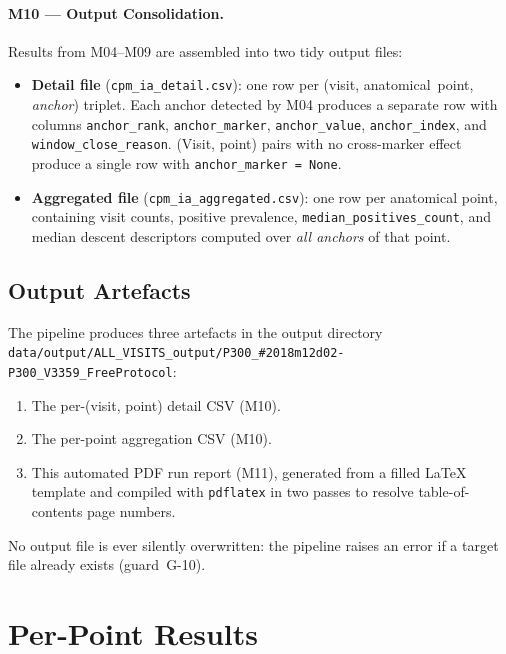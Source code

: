 \documentclass[a4paper,11pt]{article}
\begin{document}
\paragraph{M10 --- Output Consolidation.}
Results from M04--M09 are assembled into two tidy output files:
\begin{itemize}
  \item \textbf{Detail file} (\texttt{cpm\_ia\_detail.csv}): one row per
        (visit, anatomical~point, \emph{anchor}) triplet. Each anchor detected by M04
        produces a separate row with columns \texttt{anchor\_rank},
        \texttt{anchor\_marker}, \texttt{anchor\_value}, \texttt{anchor\_index},
        and \texttt{window\_close\_reason}.
        (Visit, point) pairs with no cross-marker effect produce a single row with
        \texttt{anchor\_marker = None}.
  \item \textbf{Aggregated file} (\texttt{cpm\_ia\_aggregated.csv}): one row per
        anatomical point, containing visit counts, positive prevalence,
        \texttt{median\_positives\_count}, and median descent descriptors computed over
        \emph{all anchors} of that point.
\end{itemize}

\subsection{Output Artefacts}

The pipeline produces three artefacts in the output directory \texttt{data/output/ALL\_VISITS\_output/P300\_\#2018m12d02-P300\_V3359\_FreeProtocol}:
\begin{enumerate}
  \item The per-(visit, point) detail CSV (M10).
  \item The per-point aggregation CSV (M10).
  \item This automated PDF run report (M11), generated from a filled \LaTeX{} template
        and compiled with \texttt{pdflatex} in two passes to resolve table-of-contents
        page numbers.
\end{enumerate}
No output file is ever silently overwritten: the pipeline raises an error if a target
file already exists (guard~G-10).

\section{Per-Point Results}
\end{document}
